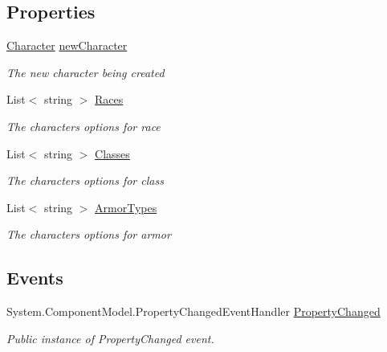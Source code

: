 \subsection*{Properties}
\begin{DoxyCompactItemize}
\item 
\mbox{\hyperlink{class_dungeons__n___dragons___manager_1_1_models_1_1_character}{Character}} \mbox{\hyperlink{class_dungeons__n___dragons___manager_1_1_viewmodels_1_1_create_character_window_viewmodel_a8492bbb3139e9cc1f83db8fa2ded4c13}{new\+Character}}
\begin{DoxyCompactList}\small\item\em The new character being created \end{DoxyCompactList}\item 
List$<$ string $>$ \mbox{\hyperlink{class_dungeons__n___dragons___manager_1_1_viewmodels_1_1_create_character_window_viewmodel_aa4ef53843ff765faf1fdf9a31228600e}{Races}}
\begin{DoxyCompactList}\small\item\em The character\textquotesingle{}s options for race \end{DoxyCompactList}\item 
List$<$ string $>$ \mbox{\hyperlink{class_dungeons__n___dragons___manager_1_1_viewmodels_1_1_create_character_window_viewmodel_abd1cb6298d82f24e4e4c6641b72980a6}{Classes}}
\begin{DoxyCompactList}\small\item\em The character\textquotesingle{}s options for class \end{DoxyCompactList}\item 
List$<$ string $>$ \mbox{\hyperlink{class_dungeons__n___dragons___manager_1_1_viewmodels_1_1_create_character_window_viewmodel_afeb10ad6ce57815ab7da89cee033b56c}{Armor\+Types}}
\begin{DoxyCompactList}\small\item\em The character\textquotesingle{}s options for armor \end{DoxyCompactList}\end{DoxyCompactItemize}
\subsection*{Events}
\begin{DoxyCompactItemize}
\item 
System.\+Component\+Model.\+Property\+Changed\+Event\+Handler \mbox{\hyperlink{class_dungeons__n___dragons___manager_1_1_viewmodels_1_1_create_character_window_viewmodel_a74e5264ae72105d6df9f055c6d307cff}{Property\+Changed}}
\begin{DoxyCompactList}\small\item\em Public instance of Property\+Changed event. \end{DoxyCompactList}\end{DoxyCompactItemize}
